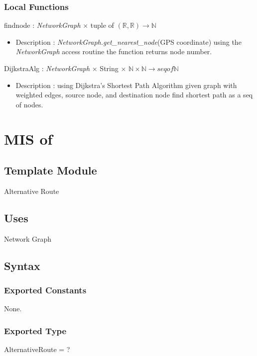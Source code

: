 \documentclass[12pt, titlepage]{article}
\begin{document}
\subsubsection{Local Functions}

findnode : \emph{NetworkGraph} $\times$ tuple of $(\mathbb{R}, \mathbb{R})  \rightarrow \mathbb{N}$
\begin{itemize}
    \item Description : \emph{NetworkGraph.get\_nearest\_node}(GPS coordinate) using the \emph{NetworkGraph} access routine the function returns node number.
\end{itemize}
DijkstraAlg : \emph{NetworkGraph} $\times$ String $\times$ $\mathbb{N} \times \mathbb{N}  \rightarrow seq of \mathbb{N}$
\begin{itemize}
    \item Description : using Dijkstra’s Shortest Path Algorithm given graph with weighted edges, source node, and destination node find shortest path as a seq of nodes.
\end{itemize}
\newpage

\section{MIS of } \label{ModuleSPath} 

\subsection{Template Module}
Alternative Route

\subsection{Uses}%
Network Graph

\subsection{Syntax}

\subsubsection{Exported Constants}
None.

\subsubsection{Exported Type}
AlternativeRoute = ?
\end{document}
